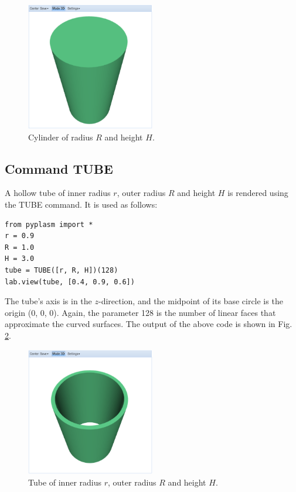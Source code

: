 \documentclass[article,A4,12pt]{llncs}
\begin{document}
\begin{figure}[!ht]
\begin{center}
\includegraphics[width=0.5\textwidth]{img/cyl-1.png}
\end{center}
\vspace{-2mm}
\caption{Cylinder of radius $R$ and height $H$.}
\label{fig:cyl-1}
\end{figure}

\subsection{Command TUBE}

A hollow tube of inner radius $r$, outer radius $R$ and height
$H$ is rendered using the TUBE command. It is used as follows:
\begin{verbatim}
from pyplasm import *
r = 0.9
R = 1.0
H = 3.0
tube = TUBE([r, R, H])(128)
lab.view(tube, [0.4, 0.9, 0.6])
\end{verbatim}
The tube's axis is in the $z$-direction, and the midpoint of
its base circle is the origin (0, 0, 0). Again, the parameter
128 is the number of linear faces that approximate the 
curved surfaces. The output of the above code is shown in Fig. \ref{fig:tube-1}.

\begin{figure}[!ht]
\begin{center}
\includegraphics[width=0.5\textwidth]{img/tube-1.png}
\end{center}
\vspace{-2mm}
\caption{Tube of inner radius $r$, outer radius $R$ and height $H$.}
\label{fig:tube-1}
\end{figure}
\end{document}

